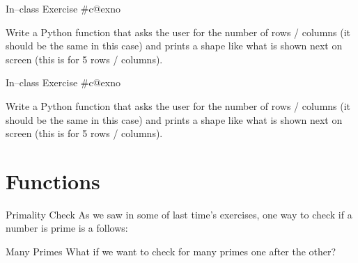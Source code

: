 \documentclass[aspectratio=169, 12pt, xcolor=table]{beamer}
\makeatletter
\newcommand{\arabicthree}[1]{\expandafter\@arabicthree\csname c@#1\endcsname}
\newcommand{\@arabicthree}[1]{\ifnum #1<100 0\fi\ifnum #1<10 0\fi\number#1}
\newcounter{exno}
\newcommand{\exno}{\stepcounter{exno}In--class Exercise \#\arabicthree{exno}}
\makeatother
\begin{document}
	\begin{frame}{\exno}
		\begin{minipage}{0.5\textwidth}
			Write a Python function that asks the user for the number of rows / columns (it should be the same in this case) and prints a shape like what is shown next on screen (this is for 5 rows / columns).
		\end{minipage}\hfill
		\begin{minipage}{0.45\textwidth}
			\centering
		\end{minipage}
	\end{frame}
	
	\begin{frame}{\exno}
		\begin{minipage}{0.5\textwidth}
			Write a Python function that asks the user for the number of rows / columns (it should be the same in this case) and prints a shape like what is shown next on screen (this is for 5 rows / columns).
		\end{minipage}\hfill
		\begin{minipage}{0.45\textwidth}
			\centering
		\end{minipage}
	\end{frame}

	\section{Functions}\label{sec:functions}
	
	\sectionframe
	
	\begin{frame}{Primality Check}
		As we saw in some of last time's exercises, one way to check if a number is prime is a follows:
		
	\end{frame}

	\begin{frame}{Many Primes}
		What if we want to check for many primes one after the other?\pause
		
	\end{frame}
\end{document}
